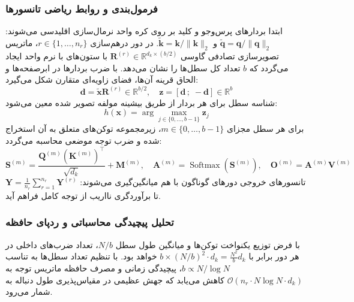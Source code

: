 \subsubsection*{فرمول‌بندی و روابط ریاضی تانسورها}
ابتدا بردارهای پرس‌وجو و کلید بر روی کره واحد نرمال‌سازی اقلیدسی می‌شوند: $\tilde{\mathbf{q}} = \mathbf{q}/\|\mathbf{q}\|_2$ و $\tilde{\mathbf{k}} = \mathbf{k}/\|\mathbf{k}\|_2$. در دور درهم‌سازی $r \in \{1, \dots, n_r\}$، ماتریس تصویرسازی تصادفی گاوسی $\mathbf{R}^{(r)} \in \mathbb{R}^{d_k \times (b/2)}$ با ستون‌های با نرم واحد ایجاد می‌گردد که $b$ تعداد کل سطل‌ها را نشان می‌دهد. با ضرب بردارها در ابرصفحه‌ها و الحاق قرینه آن‌ها، فضای زاویه‌ای متقارن شکل می‌گیرد:
\begin{equation}
\mathbf{d} = \tilde{\mathbf{x}} \mathbf{R}^{(r)} \in \mathbb{R}^{b/2}, \quad \mathbf{z} = [\mathbf{d} \,;\; -\mathbf{d}] \in \mathbb{R}^b
\end{equation}
شناسه سطل برای هر بردار از طریق بیشینه مولفه تصویر شده معین می‌شود:
\begin{equation}
h(\mathbf{x}) = \arg\max_{j \in \{0, \dots, b-1\}} \mathbf{z}_j
\end{equation}
برای هر سطل مجزای $m \in \{0, \dots, b-1\}$، زیرمجموعه توکن‌های متعلق به آن استخراج شده و ضرب توجه موضعی محاسبه می‌گردد:
\begin{equation}
\mathbf{S}^{(m)} = \frac{\mathbf{Q}^{(m)} (\mathbf{K}^{(m)})^\top}{\sqrt{d_k}} + \mathbf{M}^{(m)}, \quad \mathbf{A}^{(m)} = \operatorname{Softmax}(\mathbf{S}^{(m)}), \quad \mathbf{O}^{(m)} = \mathbf{A}^{(m)} \mathbf{V}^{(m)}
\end{equation}
تانسورهای خروجی دورهای گوناگون با هم میانگین‌گیری می‌شوند: $\mathbf{Y} = \frac{1}{n_r} \sum_{r=1}^{n_r} \mathbf{Y}^{(r)}$ تا برآوردگری نااریب از توجه کامل فراهم آید.

\subsubsection*{تحلیل پیچیدگی محاسباتی و ردپای حافظه}
با فرض توزیع یکنواخت توکن‌ها و میانگین طول سطل $N/b$، تعداد ضرب‌های داخلی در هر دور برابر با $b \times (N/b)^2 \cdot d_k = \frac{N^2}{b} d_k$ خواهد بود. با تنظیم تعداد سطل‌ها به تناسب $b \propto N/\log N$، پیچیدگی زمانی و مصرف حافظه ماتریس توجه به $\mathcal{O}(n_r \cdot N \log N \cdot d_k)$ کاهش می‌یابد که جهش عظیمی در مقیاس‌پذیری طول دنباله به شمار می‌رود.


